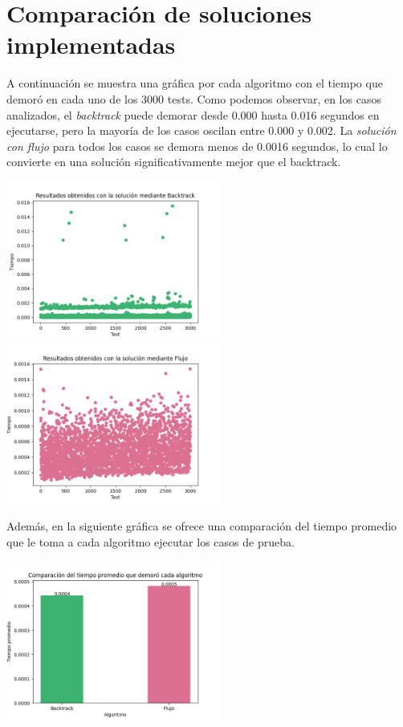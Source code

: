 \documentclass[10pt]{article} %
\begin{document}
	\section{Comparaci\'on de soluciones implementadas}          

    A continuaci\'on se muestra una gr\'afica por cada algoritmo con el tiempo que demor\'o en cada uno de los 3000 tests. Como podemos observar, en los casos analizados, el \textit{backtrack} puede demorar desde 0.000 hasta 0.016 segundos en ejecutarse, pero la mayor\'ia de los casos oscilan entre 0.000 y 0.002. La \textit{soluci\'on con flujo} para todos los casos se demora menos de 0.0016 segundos, lo cual lo convierte en una soluci\'on significativamente mejor que el backtrack.
    
    \begin{center}
    	\includegraphics[width=7cm]{Backtrack_results.png}
    	\includegraphics[width=7cm]{Flujo_results.png}
    \end{center}  
    
    Adem\'as, en la siguiente gr\'afica se ofrece una comparaci\'on del tiempo promedio que le toma a cada algoritmo ejecutar los casos de prueba. 
    
    \begin{center}
    	\includegraphics[width=7cm]{Bar_comparative_plot.png}
    \end{center}
	
\end{document}
